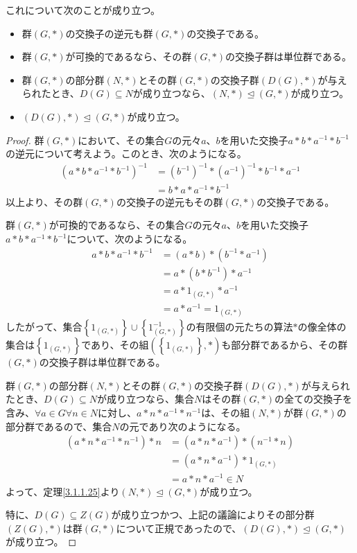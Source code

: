 \documentclass[dvipdfmx]{jsarticle}
\begin{document}
\begin{thm}\label{3.1.1.43}
これについて次のことが成り立つ。
\begin{itemize}
\item
  群$(G,*)$の交換子の逆元も群$(G,*)$の交換子である。
\item
  群$(G,*)$が可換的であるなら、その群$(G,*)$の交換子群は単位群である。
\item
  群$(G,*)$の部分群$(N,*)$とその群$(G,*)$の交換子群$\left( D(G),* \right)$が与えられたとき、$D(G) \subseteq N$が成り立つなら、$(N,*) \trianglelefteq (G,*)$が成り立つ。
\item
  $\left( D(G),* \right) \trianglelefteq (G,*)$が成り立つ。
\end{itemize}
\end{thm}
\begin{proof}
群$(G,*)$において、その集合$G$の元々$a$、$b$を用いた交換子$a*b*a^{- 1}*b^{- 1}$の逆元について考えよう。このとき、次のようになる。
\begin{align*}
\left( a*b*a^{- 1}*b^{- 1} \right)^{- 1} &= \left( b^{- 1} \right)^{- 1}*\left( a^{- 1} \right)^{- 1}*b^{- 1}*a^{- 1}\\
&= b*a*a^{- 1}*b^{- 1}
\end{align*}
以上より、その群$(G,*)$の交換子の逆元もその群$(G,*)$の交換子である。\par
群$(G,*)$が可換的であるなら、その集合$G$の元々$a$、$b$を用いた交換子$a*b*a^{- 1}*b^{- 1}$について、次のようになる。
\begin{align*}
a*b*a^{- 1}*b^{- 1} &= (a*b)*\left( b^{- 1}*a^{- 1} \right)\\
&= a*\left( b*b^{- 1} \right)*a^{- 1}\\
&= a*1_{(G,*)}*a^{- 1}\\
&= a*a^{- 1} = 1_{(G,*)}
\end{align*}
したがって、集合$\left\{ 1_{(G,*)} \right\} \cup \left\{ 1_{(G,*)}^{- 1} \right\}$の有限個の元たちの算法$*$の像全体の集合は$\left\{ 1_{(G,*)} \right\}$であり、その組$\left( \left\{ 1_{(G,*)} \right\},* \right)$も部分群であるから、その群$(G,*)$の交換子群は単位群である。\par
群$(G,*)$の部分群$(N,*)$とその群$(G,*)$の交換子群$\left( D(G),* \right)$が与えられたとき、$D(G) \subseteq N$が成り立つなら、集合$N$はその群$(G,*)$の全ての交換子を含み、$\forall a \in G\forall n \in N$に対し、$a*n*a^{- 1}*n^{- 1}$は、その組$(N,*)$が群$(G,*)$の部分群であるので、集合$N$の元であり次のようになる。
\begin{align*}
\left( a*n*a^{- 1}*n^{- 1} \right)*n &= \left( a*n*a^{- 1} \right)*\left( n^{- 1}*n \right)\\
&= \left( a*n*a^{- 1} \right)*1_{(G,*)}\\
&= a*n*a^{- 1} \in N
\end{align*}
よって、定理\ref{3.1.1.25}より$(N,*) \trianglelefteq (G,*)$が成り立つ。\par
特に、$D(G) \subseteq Z(G)$が成り立つかつ、上記の議論によりその部分群$\left( Z(G),* \right)$は群$(G,*)$について正規であったので、$\left( D(G),* \right) \trianglelefteq (G,*)$が成り立つ。
\end{proof}
\end{document}

